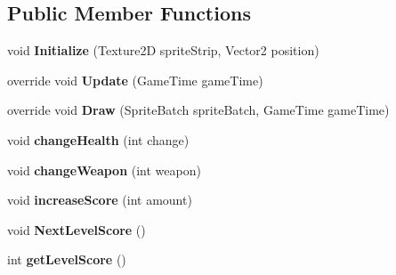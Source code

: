 \subsection*{Public Member Functions}
\begin{DoxyCompactItemize}
\item 
\hypertarget{class_tile_engine_1_1_player_a40932b9bf69a88c42467a2fb2a8e5255}{void {\bfseries Initialize} (Texture2\-D sprite\-Strip, Vector2 position)}\label{de/dfa/class_tile_engine_1_1_player_a40932b9bf69a88c42467a2fb2a8e5255}

\item 
\hypertarget{class_tile_engine_1_1_player_add7b752fcd9f9cb94302c577f8088528}{override void {\bfseries Update} (Game\-Time game\-Time)}\label{de/dfa/class_tile_engine_1_1_player_add7b752fcd9f9cb94302c577f8088528}

\item 
\hypertarget{class_tile_engine_1_1_player_a3150892fc641203e9bfee6b21a202ce5}{override void {\bfseries Draw} (Sprite\-Batch sprite\-Batch, Game\-Time game\-Time)}\label{de/dfa/class_tile_engine_1_1_player_a3150892fc641203e9bfee6b21a202ce5}

\item 
\hypertarget{class_tile_engine_1_1_player_a1f2e40accd441a1bbd6e213af5fb5314}{void {\bfseries change\-Health} (int change)}\label{de/dfa/class_tile_engine_1_1_player_a1f2e40accd441a1bbd6e213af5fb5314}

\item 
\hypertarget{class_tile_engine_1_1_player_abf7f40e5c53bad024c041f21e0a754f2}{void {\bfseries change\-Weapon} (int weapon)}\label{de/dfa/class_tile_engine_1_1_player_abf7f40e5c53bad024c041f21e0a754f2}

\item 
\hypertarget{class_tile_engine_1_1_player_aec85e347f9cf381981efb1f9590741df}{void {\bfseries increase\-Score} (int amount)}\label{de/dfa/class_tile_engine_1_1_player_aec85e347f9cf381981efb1f9590741df}

\item 
\hypertarget{class_tile_engine_1_1_player_ae8bca588776c05e074fb753eeb7e86c9}{void {\bfseries Next\-Level\-Score} ()}\label{de/dfa/class_tile_engine_1_1_player_ae8bca588776c05e074fb753eeb7e86c9}

\item 
\hypertarget{class_tile_engine_1_1_player_a343a9468c20e6c140ef23653cd70b942}{int {\bfseries get\-Level\-Score} ()}\label{de/dfa/class_tile_engine_1_1_player_a343a9468c20e6c140ef23653cd70b942}


\end{DoxyCompactItemize}
